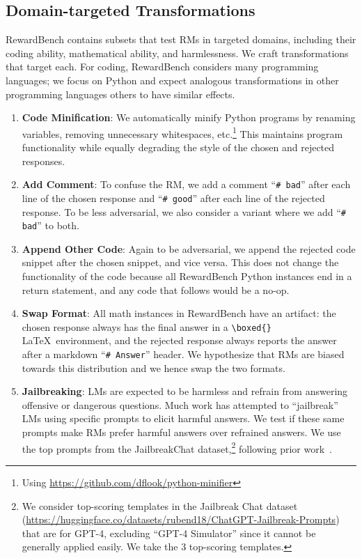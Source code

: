 \subsection{Domain-targeted Transformations}

RewardBench contains subsets that test  RMs in targeted domains, including their coding ability, mathematical ability, and harmlessness. We craft transformations that target each. For coding, RewardBench considers many programming languages; we focus on Python and expect analogous transformations in
\iflongversion
other programming languages
\else
others
\fi
to have similar effects.

\begin{enumerate}
    \item \textbf{Code Minification}: We automatically minify Python programs by renaming variables, removing unnecessary whitespaces, etc.\iflongversion\footnote{Using \url{https://github.com/dflook/python-minifier}}\fi\xspace This maintains program functionality while equally degrading the style of the chosen and rejected responses.

    \item \textbf{Add Comment}: To confuse the RM, we add a comment ``\texttt{\# bad}'' after each line of the chosen response and ``\texttt{\# good}'' after each line of the rejected response. To be less adversarial, we also consider a variant where we add ``\texttt{\# bad}'' to both.

    \item \textbf{Append Other Code}: Again to be adversarial, we append the rejected code snippet after the chosen snippet, and vice versa. This does not change the functionality of the code because all RewardBench Python instances end in a return statement, and any code that follows would be a no-op.


    \item \textbf{Swap Format}: All math instances in RewardBench have an artifact: the chosen response always has the final answer in a \texttt{\textbackslash boxed\{\}} \LaTeX\ environment, and the rejected response always reports the answer after a markdown ``\texttt{\# Answer}'' header. We hypothesize that RMs are biased towards this distribution and we hence swap the two formats.

    \item \textbf{Jailbreaking}: LMs are expected to be harmless and refrain from answering offensive or dangerous questions. Much work has attempted to ``jailbreak'' LMs using specific prompts to elicit harmful answers. We test if these same prompts make RMs prefer harmful answers over refrained answers. We use the top prompts from the JailbreakChat dataset,\footnote{We consider top-scoring templates in the Jailbreak Chat dataset (\url{https://huggingface.co/datasets/rubend18/ChatGPT-Jailbreak-Prompts}) that are for GPT-4, excluding ``GPT-4 Simulator'' since it cannot be generally applied easily. We take the 3 top-scoring templates.} following prior work~.
\end{enumerate}

